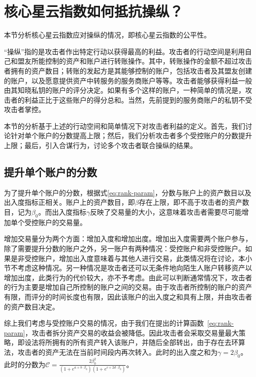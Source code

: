 
\section{核心星云指数如何抵抗操纵？}
本节分析核心星云指数应对操纵的情况，即核心星云指数的公平性。

“操纵”指的是攻击者作出特定行动以获得最高的利益。攻击者的行动空间是利用自己和盟友所能控制的资产和账户进行转账操作。其中，转账操作的金额不超过攻击者拥有的资产数目；转账的发起方是其能够控制的账户，包括攻击者及其盟友创建的账户，以及愿意提供资产中转服务的服务商账户等等。攻击者能够获得利益一般由其知晓私钥的账户的评分决定。如果有多个这样的账户，一种简单的情况是，攻击者的利益正比于这些账户的得分总和。当然，先前提到的服务商账户的私钥不受攻击者掌控。

本节的分析基于上述的行动空间和简单情况下对攻击者利益的定义。首先，我们讨论针对单个账户的分数提高上限；然后，我们分析攻击者多个受控账户的分数提升上限；最后，引入合谋行为，讨论多个攻击者联合操纵的结果。


\subsection{提升单个账户的分数 \label{sec:cheat-single}}
为了提升单个账户的分数，根据式\ref{eq:rank-param}，分数与账户上的资产数目以及出入度指标正相关。账户上的资产数目，即$\beta$存在上限，即不高于攻击者的资产数目，记为$\beta_0$。而出入度指标$\gamma$反映了交易量的大小，这意味着攻击者需要尽可能增加单个受控账户的交易量。

增加交易量分为两个方面：增加入度和增加出度。增加出入度需要两个账户参与，除了需要提升分数的账户之外，另一账户有两种情况：受控账户和非受控账户。如果是非受控账户，增加出入度意味着与其他人进行交易，此类情况将在讨论，本小节不考虑这种情况。另一种情况是攻击者还可以无条件地向陌生人账户转移资产以增加出度，此类行为的代价较大，亦不予考虑。由此可以判断通常情况下，攻击者的行为主要是增加自己所控制的账户之间的交易。由于攻击者所控制的账户的资产有限，而评分的时间长度也有限，因此该账户的出入度之和具有上限，并由攻击者的资产数目决定。

综上我们考虑与受控账户交易的情况，由于我们在提出的计算函数~\ref{eq:rank-param}，攻击者拆分资产交易的收益会被降低。因此攻击者会采取交易量最大策略，即设法将所拥有的所有资产转入该账户，并随后全部转出，由于存在去环算法，攻击者的资产无法在当前时间段内再次转入。此时的出入度之和为$\gamma = 2 \beta_0$。此时的分数为$\mathcal{C} =  \frac{2 \beta_0 ^2}{ (1+e^{a + b \cdot \beta_0}) (1+e^{c + 2 d \cdot \beta_0})}$。

